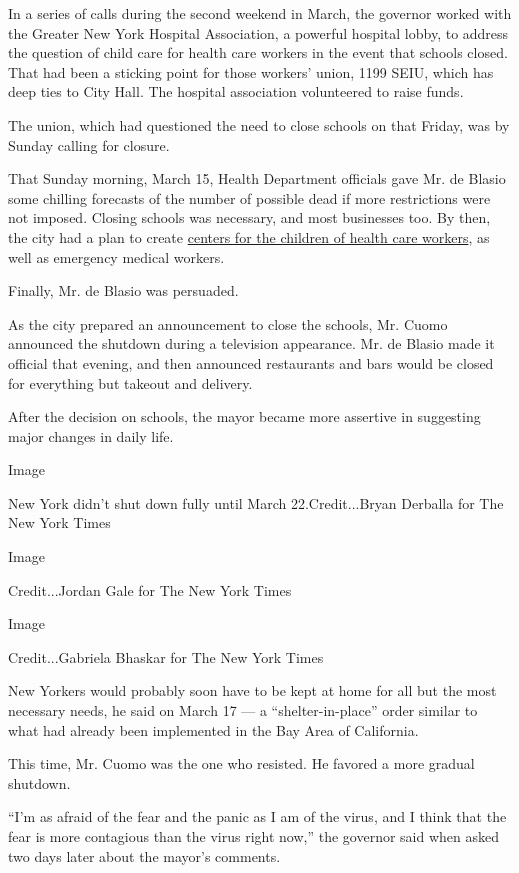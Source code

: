 In a series of calls during the second weekend in March, the governor
worked with the Greater New York Hospital Association, a powerful
hospital lobby, to address the question of child care for health care
workers in the event that schools closed. That had been a sticking point
for those workers' union, 1199 SEIU, which has deep ties to City Hall.
The hospital association volunteered to raise funds.

The union, which had questioned the need to close schools on that
Friday, was by Sunday calling for closure.

That Sunday morning, March 15, Health Department officials gave Mr. de
Blasio some chilling forecasts of the number of possible dead if more
restrictions were not imposed. Closing schools was necessary, and most
businesses too. By then, the city had a plan to create
\href{https://www.schools.nyc.gov/enrollment/enrollment-help/regional-enrichment-centers}{centers
for the children of health care workers}, as well as emergency medical
workers.

Finally, Mr. de Blasio was persuaded.

As the city prepared an announcement to close the schools, Mr. Cuomo
announced the shutdown during a television appearance. Mr. de Blasio
made it official that evening, and then announced restaurants and bars
would be closed for everything but takeout and delivery.

After the decision on schools, the mayor became more assertive in
suggesting major changes in daily life.

Image

New York didn't shut down fully until March 22.Credit...Bryan Derballa
for The New York Times

Image

Credit...Jordan Gale for The New York Times

Image

Credit...Gabriela Bhaskar for The New York Times

New Yorkers would probably soon have to be kept at home for all but the
most necessary needs, he said on March 17 --- a ``shelter-in-place''
order similar to what had already been implemented in the Bay Area of
California.

This time, Mr. Cuomo was the one who resisted. He favored a more gradual
shutdown.

``I'm as afraid of the fear and the panic as I am of the virus, and I
think that the fear is more contagious than the virus right now,'' the
governor said when asked two days later about the mayor's comments.

